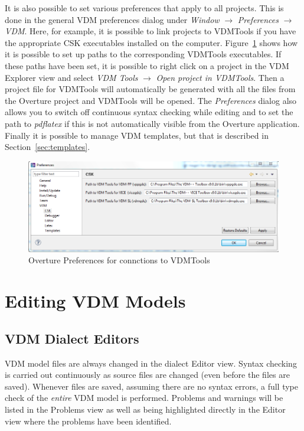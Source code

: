 \documentclass{overturerepchap}
\begin{document}
It is also possible to set various preferences that apply to
all projects. This is done in the general VDM preferences dialog under
\emph{Window} $\rightarrow$ \emph{Preferences} $\rightarrow$
\emph{VDM}. Here, for example, it is possible to link projects to
VDMTools if you have the appropriate CSK executables installed on
the computer. Figure~\ref{fig:CSKPreferences} shows how it is possible to
set up paths to the corresponding VDMTools executables. If these paths have
been set, it is possible to right click on a project in the VDM
Explorer view and select \emph{VDM Tools} $\rightarrow$
\emph{Open project in VDMTools}. Then a project file for VDMTools
will automatically be generated with all the files from the Overture project
and VDMTools will be opened. The \emph{Preferences} dialog also
allows you to switch off continuous syntax checking while editing and
to set the path to \emph{pdflatex} if this is not automatically
visible from the Overture application. Finally it is possible to 
manage VDM templates, but that is described in Section~\ref{sec:templates}. 

\begin{figure}[!hbt]
\begin{center}
  \includegraphics[width=\textwidth]{screendumps/CSKPreferences}
  \caption{Overture Preferences for connctions to VDMTools}
  \label{fig:CSKPreferences}
\end{center}
\end{figure}

\chapter{Editing VDM Models}\label{sec:editVDM}

\section{VDM Dialect Editors}

VDM model files are always changed in the dialect Editor view. Syntax checking
is carried out continuously as source files are
changed (even before the files are saved). Whenever files are saved, assuming
there are no syntax errors, a full type check of the \emph{entire} VDM model is
performed.
Problems and warnings will be listed in the Problems view as well as
being highlighted directly in the Editor view where the problems have been
identified.
\end{document}
